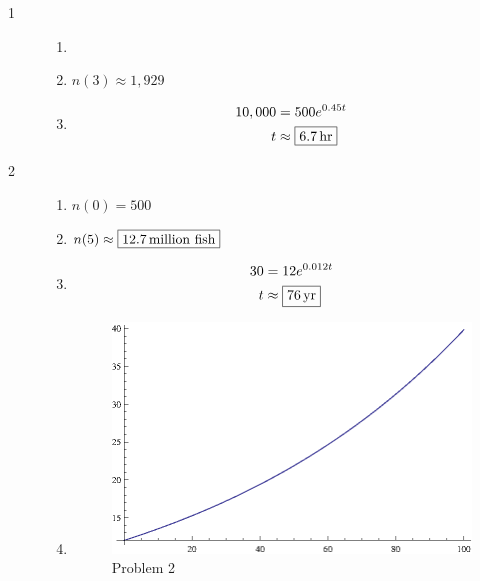 \documentclass{exam}
\begin{document}
    \begin{description}

      \item[1]
        \begin{enumerate}[a]
          \item {}

          \item $n(3) \approx \boxed{1,929}$

          \item
            \begin{align*}
              10,000 & = 500 e^{0.45t} \\
              t      & \approx \boxed{\unit[6.7]{hr}} \\
            \end{align*}

        \end{enumerate}

      \item[2]
        \begin{enumerate}[a]
          \item $n(0) = \boxed{500}$

          \item $n(5) \approx \boxed{ \unit[12.7]{million\ fish}} $

          \item
            \begin{align*}
              30 & = 12 e^{0.012t} \\
              t      & \approx \boxed{\unit[76]{yr}} \\
            \end{align*}

          \item
            \begin{figure}[H]
              \centering
              \includegraphics{problem2.eps}
              \caption{Problem 2}
            \end{figure}
        \end{enumerate}

    \end{description}
\end{document}
